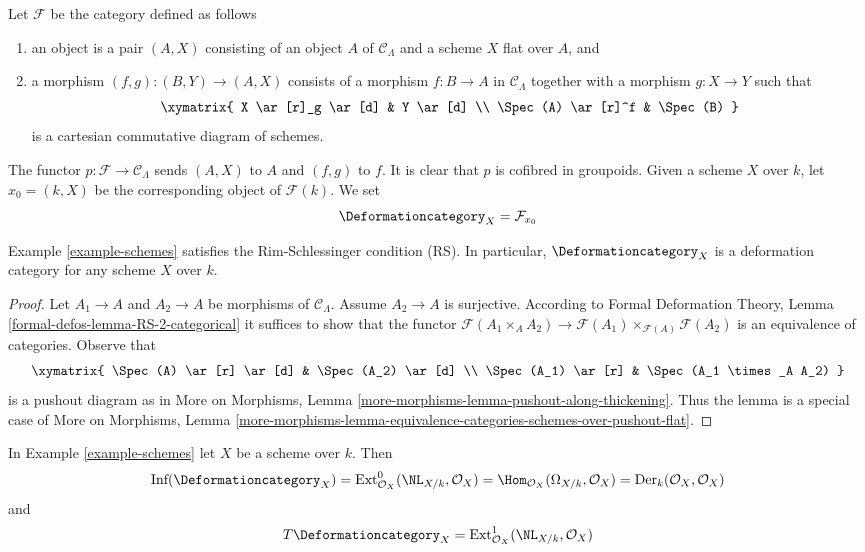 \begin{example}[Schemes]
\label{example-schemes}
Let $\mathcal{F}$ be the category defined as follows
\begin{enumerate}
\item an object is a pair $(A, X)$ consisting of an
object $A$ of $\mathcal{C}_\Lambda$ and a scheme $X$ flat over $A$, and
\item a morphism $(f, g) : (B, Y) \to (A, X)$ consists of
a morphism $f : B \to A$ in $\mathcal{C}_\Lambda$ together
with a morphism $g : X \to Y$ such that
$$
\xymatrix{
X \ar[r]_g \ar[d] & Y \ar[d] \\
\Spec(A) \ar[r]^f & \Spec(B)
}
$$
is a cartesian commutative diagram of schemes.
\end{enumerate}
The functor $p : \mathcal{F} \to \mathcal{C}_\Lambda$ sends $(A, X)$
to $A$ and $(f, g)$ to $f$. It is clear that $p$ is cofibred in groupoids.
Given a scheme $X$ over $k$, let $x_0 = (k, X)$ be the corresponding object
of $\mathcal{F}(k)$. We set
$$
\Deformationcategory_X = \mathcal{F}_{x_0}
$$
\end{example}

\begin{lemma}
\label{lemma-schemes-RS}
Example \ref{example-schemes}
satisfies the Rim-Schlessinger condition (RS).
In particular, $\Deformationcategory_X$ is a deformation category
for any scheme $X$ over $k$.
\end{lemma}

\begin{proof}
Let $A_1 \to A$ and $A_2 \to A$ be morphisms of $\mathcal{C}_\Lambda$.
Assume $A_2 \to A$ is surjective. According to
Formal Deformation Theory, Lemma
\ref{formal-defos-lemma-RS-2-categorical}
it suffices to show that the functor
$\mathcal{F}(A_1 \times_A A_2) \to
\mathcal{F}(A_1) \times_{\mathcal{F}(A)} \mathcal{F}(A_2)$
is an equivalence of categories.
Observe that
$$
\xymatrix{
\Spec(A) \ar[r] \ar[d] & \Spec(A_2) \ar[d] \\
\Spec(A_1) \ar[r] &
\Spec(A_1 \times_A A_2)
}
$$
is a pushout diagram as in More on Morphisms, Lemma
\ref{more-morphisms-lemma-pushout-along-thickening}.
Thus the lemma is a special case of More on Morphisms, Lemma
\ref{more-morphisms-lemma-equivalence-categories-schemes-over-pushout-flat}.
\end{proof}

\begin{lemma}
\label{lemma-schemes-TI}
In Example \ref{example-schemes} let $X$ be a scheme over $k$. Then
$$
\text{Inf}(\Deformationcategory_X) =
\text{Ext}^0_{\mathcal{O}_X}(\NL_{X/k}, \mathcal{O}_X) =
\Hom_{\mathcal{O}_X}(\Omega_{X/k}, \mathcal{O}_X) =
\text{Der}_k(\mathcal{O}_X, \mathcal{O}_X)
$$
and
$$
T\Deformationcategory_X =
\text{Ext}^1_{\mathcal{O}_X}(\NL_{X/k}, \mathcal{O}_X)
$$
\end{lemma}

